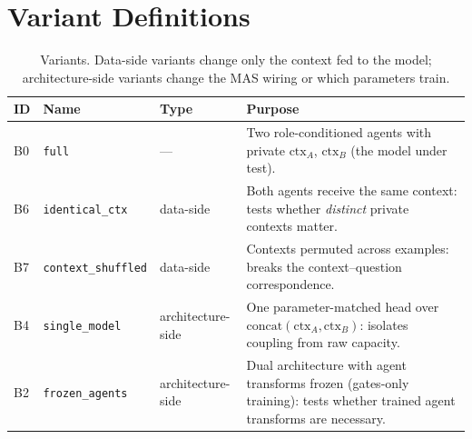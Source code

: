 \documentclass[10pt]{article}
\newcommand{\ctxa}{$\text{ctx}_A$}
\newcommand{\ctxb}{$\text{ctx}_B$}
\begin{document}
\section{Variant Definitions}
\begin{table}[H]
\centering
\small
\begin{tabular}{@{}l l l p{7.6cm}@{}}
\toprule
\textbf{ID} & \textbf{Name} & \textbf{Type} & \textbf{Purpose} \\
\midrule
B0 & \texttt{full}             & ---               & Two role-conditioned agents with private \ctxa{}, \ctxb{} (the model under test). \\
B6 & \texttt{identical\_ctx}   & data-side         & Both agents receive the same context: tests whether \emph{distinct} private contexts matter. \\
B7 & \texttt{context\_shuffled}& data-side         & Contexts permuted across examples: breaks the context--question correspondence. \\
B4 & \texttt{single\_model}    & architecture-side & One parameter-matched head over $\text{concat}(\text{ctx}_A,\text{ctx}_B)$: isolates coupling from raw capacity. \\
B2 & \texttt{frozen\_agents}   & architecture-side & Dual architecture with agent transforms frozen (gates-only training): tests whether trained agent transforms are necessary. \\
\bottomrule
\end{tabular}
\caption{Variants. Data-side variants change only the context fed to the model;
architecture-side variants change the MAS wiring or which parameters train.}
\end{table}
\end{document}
